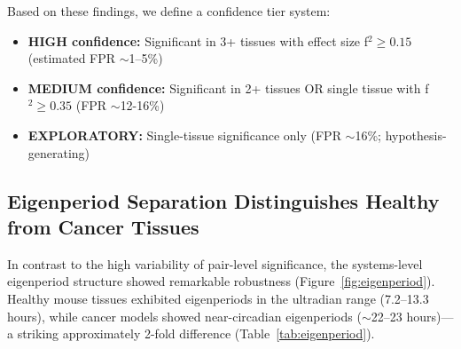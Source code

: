 \documentclass[11pt,a4paper]{article}
\begin{document}
Based on these findings, we define a confidence tier system:

\begin{itemize}
    \item \textbf{HIGH confidence:} Significant in 3+ tissues with effect size f$^2 \geq 0.15$ (estimated FPR $\sim$1--5\%)
    \item \textbf{MEDIUM confidence:} Significant in 2+ tissues OR single tissue with f$^2 \geq 0.35$ (FPR $\sim$12-16\%)
    \item \textbf{EXPLORATORY:} Single-tissue significance only (FPR $\sim$16\%; hypothesis-generating)
\end{itemize}

\subsection{Eigenperiod Separation Distinguishes Healthy from Cancer Tissues}

In contrast to the high variability of pair-level significance, the systems-level eigenperiod structure showed remarkable robustness (Figure~\ref{fig:eigenperiod}). Healthy mouse tissues exhibited eigenperiods in the ultradian range (7.2--13.3 hours), while cancer models showed near-circadian eigenperiods ($\sim$22--23 hours)---a striking approximately 2-fold difference (Table~\ref{tab:eigenperiod}).
\end{document}
